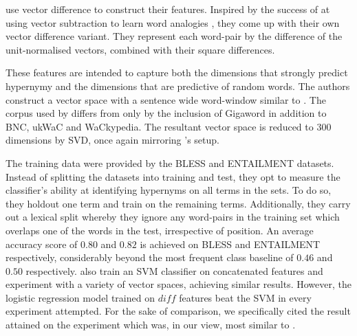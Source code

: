 \citeauthor{roller2014inclusive} use vector difference to construct their features.  Inspired by the success of \citeauthor{mikolov2013distributed} at using vector subtraction to learn word analogies \citep{mikolov2013distributed}, they come up with their own vector difference variant.  They represent each word-pair by the difference of the unit-normalised vectors, combined with their square differences.  

These features are intended to capture both the dimensions that strongly predict hypernymy and the dimensions that are predictive of random words.
The authors construct a vector space with a sentence wide word-window similar to \citep{baroni2012entailment}.  The corpus used by \citep{roller2014inclusive} differs from \citep{baroni2012entailment} only by the inclusion of Gigaword in addition to BNC, ukWaC and WaCkypedia.  The resultant vector space is reduced to $300$ dimensions by \ac{SVD}, once again mirroring \citeauthor{baroni2012entailment}'s setup.  

The training data were provided by the BLESS and ENTAILMENT datasets.  Instead of splitting the datasets into training and test, they opt to measure the classifier’s ability at identifying hypernyms on all terms in the sets.  To do so, they holdout one term and train on the remaining terms.  Additionally, they carry out a lexical split whereby they ignore any word-pairs in the training set which overlaps one of the words in the test, irrespective of position.  An average accuracy score of $0.80$ and $0.82$ is achieved on BLESS and ENTAILMENT respectively, considerably beyond the most frequent class baseline of $0.46$ and $0.50$ respectively.  \citeauthor{roller2014inclusive} also train an \ac{SVM} classifier on concatenated features and experiment with a variety of vector spaces, achieving similar results.  However, the logistic regression model trained on $diff$ features beat the \ac{SVM} in every experiment attempted.  For the sake of comparison, we specifically cited the result attained on the experiment which was, in our view, most similar to \citep{baroni2012entailment}.

